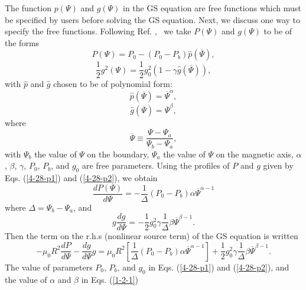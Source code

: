 \documentclass{article}
\begin{document}
The function $p (\Psi)$ and $g (\Psi)$ in the GS equation are free functions
which must be specified by users before solving the GS equation. Next, we
discuss one way to specify the free functions. Following Ref.
{\cite{jardin2010}}, \ we take $P (\Psi)$ and $g (\Psi)$ to be of the forms
\begin{equation}
  \label{4-28-p1} P (\Psi) = P_0 - (P_0 - P_b) \hat{p} (\overline{\Psi}),
\end{equation}
\begin{equation}
  \label{4-28-p2} \frac{1}{2} g^2 (\Psi) = \frac{1}{2} g_0^2 (1 - \gamma
  \hat{g} (\overline{\Psi})),
\end{equation}
with $\hat{p}$ and $\hat{g}$ chosen to be of polynomial form:
\begin{equation}
  \label{1-2-1} \hat{p} (\overline{\Psi}) = \overline{\Psi}^{\alpha},
\end{equation}
\begin{equation}
  \label{1-2-2} \hat{g} (\overline{\Psi}) = \overline{\Psi}^{\beta},
\end{equation}
where
\begin{equation}
  \overline{\Psi} \equiv \frac{\Psi - \Psi_a}{\Psi_b - \Psi_a},
\end{equation}
with $\Psi_b$ the value of $\Psi$ on the boundary, $\Psi_a$ the value of
$\Psi$ on the magnetic axis, $\alpha$, $\beta$, $\gamma$, $P_0$, $P_b$, and
$g_0$ are free parameters. Using the profiles of $P$ and $g$ given by Eqs.
(\ref{4-28-p1}) and (\ref{4-28-p2}), we obtain
\begin{equation}
  \frac{d P (\Psi)}{d \Psi} = - \frac{1}{\Delta} (P_0 - P_b) \alpha
  \overline{\Psi}^{\alpha - 1}
\end{equation}
where $\Delta = \Psi_b - \Psi_a$, and
\begin{equation}
  g \frac{d g}{d \Psi} = - \frac{1}{2} g_0^2 \gamma \frac{1}{\Delta} \beta
  \overline{\Psi}^{\beta - 1} .
\end{equation}
Then the term on the r.h.s (nonlinear source term) of the GS equation is
written
\begin{equation}
  - \mu_0 R^2 \frac{d P}{d \Psi} - \frac{d g}{d \Psi} g = \mu_0 R^2 \left[
  \frac{1}{\Delta} (P_0 - P_b) \alpha \overline{\Psi}^{\alpha - 1} \right] +
  \frac{1}{2} g_0^2 \gamma \frac{1}{\Delta} \beta \overline{\Psi}^{\beta - 1}
  .
\end{equation}
The value of parameters $P_0$, $P_b$, and $g_0$ in Eqs. (\ref{4-28-p1}) and
(\ref{4-28-p2}), and the value of $\alpha$ and $\beta$ in Eqs. (\ref{1-2-1})
\end{document}
